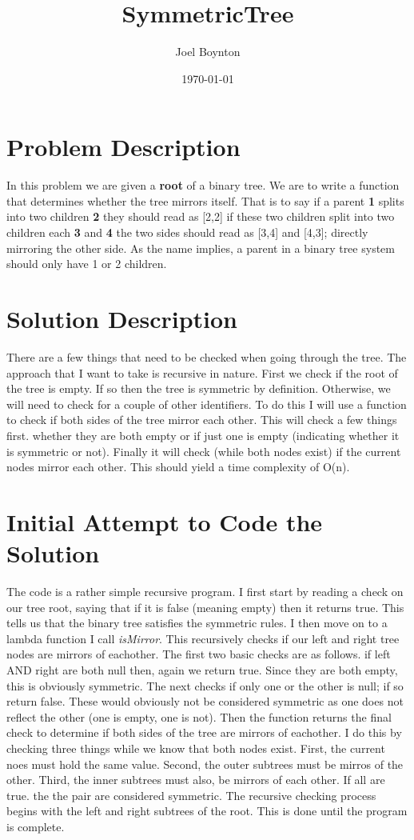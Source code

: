 \documentclass[11pt]{article}
\author{Joel Boynton}
\date{\today}
\title{SymmetricTree}
\begin{document}
\maketitle
\clearpage
\section{Problem Description}
\label{sec:org1a2fa2b}
In this problem we are given a \textbf{root} of a binary tree. We are to write a function that determines whether the tree mirrors itself. That is to say if a parent \textbf{1} splits into two children \textbf{2} they should read as [2,2] if these two children split into two children each \textbf{3} and \textbf{4} the two sides should read as [3,4] and [4,3]; directly mirroring the other side. As the name implies, a parent in a binary tree system should only have 1 or 2 children.
\section{Solution Description}
\label{sec:orgfe6b522}
There are a few things that need to be checked when going through the tree. The approach that I want to take is recursive in nature. First we check if the root of the tree is empty. If so then the tree is symmetric by definition. Otherwise, we will need to check for a couple of other identifiers. To do this I will use a function to check if both sides of the tree mirror each other. This will check a few things first. whether they are both empty or if just one is empty (indicating whether it is symmetric or not). Finally it will check (while both nodes exist) if the current nodes mirror each other. This should yield a time complexity of O(n).
\section{Initial Attempt to Code the Solution}
\label{sec:org3b22384}
The code is a rather simple recursive program. I first start by reading a check on our tree root, saying that if it is false (meaning empty) then it returns true. This tells us that the binary tree satisfies the symmetric rules. I then move on to a lambda function I call \emph{isMirror}. This recursively checks if our left and right tree nodes are mirrors of eachother. The first two basic checks are as follows. if left AND right are both null then, again we return true. Since they are both empty, this is obviously symmetric. The next checks if only one or the other is null; if so return false. These would obviously not be considered symmetric as one does not reflect the other (one is empty, one is not). Then the function returns the final check to determine if both sides of the tree are mirrors of eachother. I do this by checking three things while we know that both nodes exist. First, the current noes must hold the same value. Second, the outer subtrees must be mirros of the other. Third, the inner subtrees must also, be mirrors of each other. If all are true. the the pair are considered symmetric. The recursive checking process begins with the left and right subtrees of the root. This is done until the program is complete.
\end{document}
